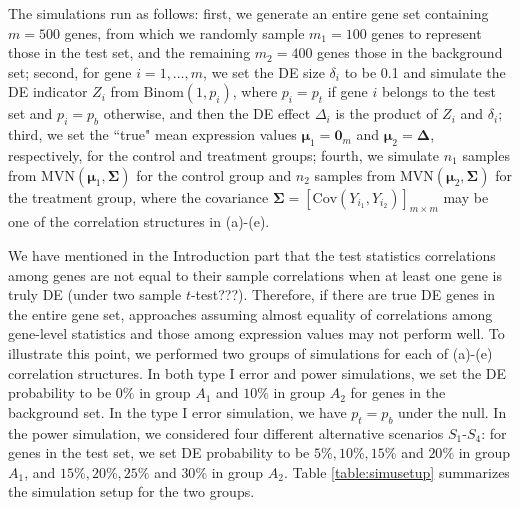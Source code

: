 \documentclass[useAMS,usenatbib, galley]{biom}
\newcommand{\aaCase}{a}
\newcommand{\fCase}{e}
\begin{document}
		The simulations run as follows: first, we generate an entire gene set containing $m=500$ genes, from which we randomly sample $m_1 = 100$ genes to represent those in the test set, and the remaining $m_2=400$ genes those in the background set; second, for gene $i=1, \ldots, m$, we set the DE size $\delta_i$ to be 0.1 and simulate the DE indicator $Z_i$ from $\text{Binom}(1, p_i)$,  where $p_i= p_t$ if gene $i$ belongs to the test set and $p_i = p_b$  otherwise, and then the DE effect $\Delta_i$ is the product of $Z_i$ and $\delta_i$; third, we set the ``true" mean expression values $\bm \mu_1 = \bm 0_m$ and $\bm \mu_2 = \bm \Delta$, respectively,  for the control and treatment groups; fourth, we simulate $n_1$ samples from $\text{MVN}(\bm \mu_1, \bm \Sigma)$ for the control group and $n_2$ samples from $\text{MVN}(\bm \mu_2, \bm \Sigma)$ for the treatment group, where the covariance $\bm \Sigma = \left[\text{Cov}(Y_{i_1}, Y_{i_2})\right]_{m\times m}$ may be one of the correlation structures in (\aaCase)-(\fCase).
		
		We have mentioned in the Introduction part that the test statistics correlations among genes are not equal to their sample correlations when at least one gene is truly DE (under two sample $t$-test???). Therefore, if there are true DE genes in the entire gene set, approaches assuming almost equality of correlations among gene-level statistics and those among expression values may not perform well. To illustrate this point, we performed two groups of simulations for each of  (\aaCase)-(\fCase) correlation structures. In both type I error and power simulations, we set the DE probability to be $0\%$ in group $A_1$ and $10\%$ in group $A_2$ for genes in the background set. In the type I error simulation, we have $p_t = p_b$ under the null. In the power simulation, we considered four different alternative scenarios $S_1$-$S_4$: for genes in the test set, we set DE probability to be $5\%, 10\%, 15\%$ and $20\%$ in group $A_1$, and $15\%, 20\%, 25\%$ and $30\%$ in group $A_2$. Table \ref{table:simusetup} summarizes the simulation setup for the two groups.
		
		
		
\end{document}

